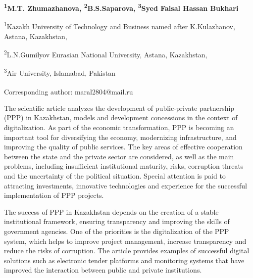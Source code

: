 
\begin{articleheader}

{\bfseries
\textsuperscript{1}M.T. Zhumazhanova\textsuperscript{\envelope },
\textsuperscript{2}B.S.Saparova,
\textsuperscript{3}Syed Faisal Hassan Bukhari
}
\end{articleheader}

\begin{affiliation}
\textsuperscript{1}Kazakh University of Technology and Business named after K.Kulazhanov, Astana, Kazakhstan,

\textsuperscript{2}L.N.Gumilyov Eurasian National University, Astana, Kazakhstan,

\textsuperscript{3}Air University, Islamabad, Pakistan

\raggedright \textsuperscript{\envelope }Corresponding author: maral2804@mail.ru
\end{affiliation}

The scientific article analyzes the development of public-private
partnership (PPP) in Kazakhstan, models and development concessions in
the context of digitalization. As part of the economic transformation,
PPP is becoming an important tool for diversifying the economy,
modernizing infrastructure, and improving the quality of public
services. The key areas of effective cooperation between the state and
the private sector are considered, as well as the main problems,
including insufficient institutional maturity, risks, corruption threats
and the uncertainty of the political situation. Special attention is
paid to attracting investments, innovative technologies and experience
for the successful implementation of PPP projects.

The success of PPP in Kazakhstan depends on the creation of a stable
institutional framework, ensuring transparency and improving the skills
of government agencies. One of the priorities is the digitalization of
the PPP system, which helps to improve project management, increase
transparency and reduce the risks of corruption. The article provides
examples of successful digital solutions such as electronic tender
platforms and monitoring systems that have improved the interaction
between public and private institutions.

